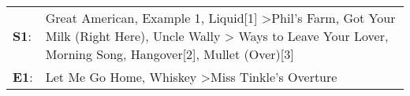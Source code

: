 \begin{supertabular}{p{0.03\textwidth}p{0.92\textwidth}}
 \textbf{S1}:  &  Great American\textsuperscript{}, \enspace Example 1\textsuperscript{}, \enspace Liquid[1]\textsuperscript{} \textgreater \enspace Phil's Farm\textsuperscript{}, \enspace Got Your Milk (Right Here)\textsuperscript{}, \enspace Uncle Wally\textsuperscript{} \textgreater {} Ways to Leave Your Lover\textsuperscript{}, \enspace Morning Song\textsuperscript{}, \enspace Hangover[2]\textsuperscript{}, \enspace Mullet (Over)[3]\textsuperscript{}  \enspace  \\
 \textbf{E1}:  &                                                                                                                                                                                                                                                                                                                                                           Let Me Go Home, Whiskey\textsuperscript{} \textgreater \enspace Miss Tinkle's Overture\textsuperscript{}  \enspace  \\
\end{supertabular}

